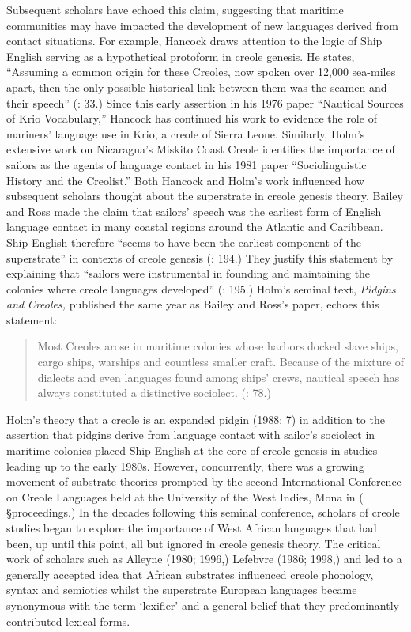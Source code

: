 Subsequent scholars have echoed this claim, suggesting that maritime communities may have impacted the development of new languages derived from contact situations. For example, Hancock draws attention to the logic of Ship English serving as a hypothetical protoform in creole genesis. He states, “Assuming a common origin for these Creoles, now spoken over 12,000 sea-miles apart, then the only possible historical link between them was the seamen and their speech” (\citealt{Hancock1976}: 33.) Since this early assertion in his 1976 paper “Nautical Sources of Krio Vocabulary,” Hancock has continued his work to evidence the role of mariners’ language use in Krio, a creole of Sierra Leone. Similarly, Holm’s extensive work on Nicaragua’s Miskito Coast Creole identifies the importance of sailors as the agents of language contact in his 1981 paper “Sociolinguistic History and the Creolist.” Both Hancock and Holm’s work influenced how subsequent scholars thought about the superstrate in creole genesis theory. \citealt{In1988} Bailey and Ross made the claim that sailors’ speech was the earliest form of English language contact in many coastal regions around the Atlantic and Caribbean. Ship English therefore “seems to have been the earliest component of the superstrate” in contexts of creole genesis (\citealt{BaileyRoss1988}: 194.) They justify this statement by explaining that “sailors were instrumental in founding and maintaining the colonies where creole languages developed” (\citealt{BaileyRoss1988}: 195.) Holm’s seminal text, \textit{Pidgins} \textit{and} \textit{Creoles,} published the same year as Bailey and Ross’s paper, echoes this statement: 

\begin{quotation}
Most Creoles arose in maritime colonies whose harbors docked slave ships, cargo ships, warships and countless smaller craft. Because of the mixture of dialects and even languages found among ships' crews, nautical speech has always constituted a distinctive sociolect. (\citealt{Holm1988}: 78.) \end{quotation}

Holm’s theory that a creole is an expanded pidgin (1988: 7) in addition to the assertion that pidgins derive from language contact with sailor’s sociolect in maritime colonies placed Ship English at the core of creole genesis in studies leading up to the early 1980s. However, concurrently, there was a growing movement of substrate theories prompted by the second International Conference on Creole Languages held at the University of the West Indies, Mona in \citealt{April1968} (\citealt{Hymes1971} §proceedings.) In the decades following this seminal conference, scholars of creole studies began to explore the importance of West African languages that had been, up until this point, all but ignored in creole genesis theory. The critical work of scholars such as Alleyne (1980; 1996,) Lefebvre (1986; 1998,) and \citet{Parkvall2000} led to a generally accepted idea that African substrates influenced creole phonology, syntax and semiotics whilst the superstrate European languages became synonymous with the term ‘lexifier’ and a general belief that they predominantly contributed lexical forms.

